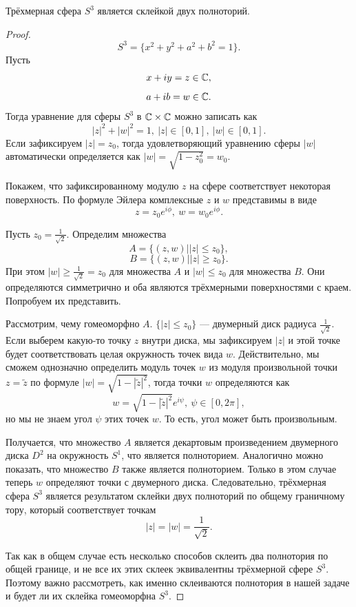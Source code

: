 \begin{statement}
    Трёхмерная сфера $S^3$ является склейкой двух полноторий.
\end{statement} 
\begin{proof}
    \[S^3 = \{x^2+y^2+a^2+b^2=1\}.\]
    Пусть 
    \[x+iy = z \in \mathbb{C},\]
    \[a+ib = w \in \mathbb{C}.\]
    Тогда уравнение для сферы $S^3$ в $\mathbb{C} \times \mathbb{C}$ можно записать как
    \[|z|^2 + |w|^2 = 1, \ |z| \in [0,1], \ |w| \in [0,1].\]
    Если зафиксируем $|z| = z_0$, тогда удовлетворяющий уравнению сферы $|w|$ автоматически определяется как $|w| = \sqrt{1-z_0^2} = w_0$.

    Покажем, что зафиксированному модулю $z$ на сфере соответствует некоторая поверхность. По формуле Эйлера комплексные $z$ и $w$ представимы в виде 
    \[z = z_0 e^{i\phi}, \ w = w_0 e^{i\phi}.\]

    Пусть $z_0 = \frac{1}{\sqrt2}$. Определим множества 
    \[A = \{(z,w) | |z| \leqslant z_0\},\]
    \[B = \{(z,w) | |z| \geqslant z_0\}.\]
    При этом $|w| \geqslant \frac{1}{\sqrt2} = z_0$ для множества $A$ и $|w| \leqslant z_0$ для множества $B$. Они определяются симметрично и оба являются трёхмерными поверхностями с краем. Попробуем их представить.

    Рассмотрим, чему гомеоморфно $A$. $\{|z| \leqslant z_0\}$ — двумерный диск радиуса $\frac{1}{\sqrt2}$. Если выберем какую-то точку $z$ внутри диска, мы зафиксируем $|z|$ и этой точке будет соответствовать целая окружность точек вида $w$. Действительно, мы сможем однозначно определить модуль точек $w$ из модуля произвольной точки $z = \tilde{z}$ по формуле $|w| = \sqrt{1-|\tilde{z}|^2}$, тогда точки $w$ определяются как $$w = \sqrt{1-|\tilde{z}|^2} e^{i\psi}, \ \psi \in [0,2\pi],$$
    но мы не знаем угол $\psi$ этих точек $w$. То есть, угол может быть произвольным.

    Получается, что множество $A$ является декартовым произведением двумерного диска $D^2$ на окружность $S^1$, что является полноторием. Аналогично можно показать, что множество $B$ также является полноторием. Только в этом случае теперь $w$ определяют точки с двумерного диска. Следовательно, трёхмерная сфера $S^3$ является результатом склейки двух полноторий по общему граничному тору, который соответствует точкам 
    \[|z| = |w| = \frac{1}{\sqrt2}.\]

    Так как в общем случае есть несколько способов склеить два полнотория по общей границе, и не все их этих склеек эквивалентны трёхмерной сфере $S^3$. Поэтому важно рассмотреть, как именно склеиваются полнотория в нашей задаче и будет ли их склейка гомеоморфна $S^3$.


\end{proof}
